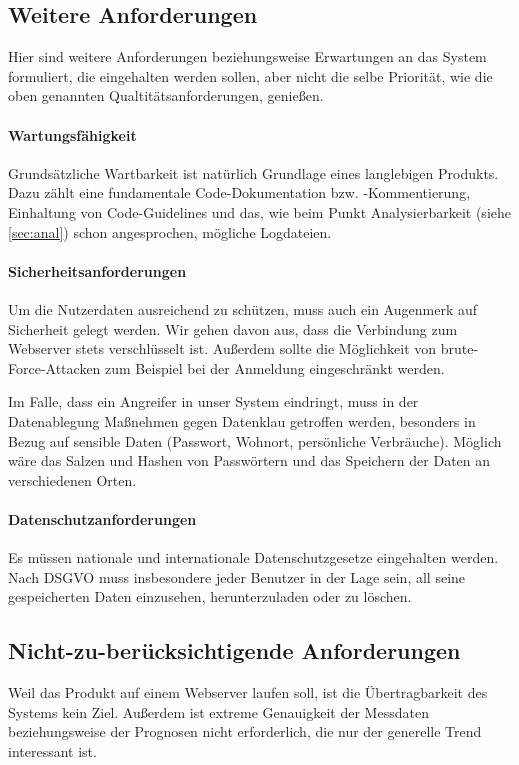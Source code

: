 \subsection{Weitere Anforderungen} \label{sec:other}
Hier sind weitere Anforderungen beziehungsweise Erwartungen an das System formuliert, die eingehalten werden sollen, aber nicht die selbe Priorität, wie die oben genannten Qualtitätsanforderungen, genießen.
\paragraph{Wartungsfähigkeit}

Grundsätzliche Wartbarkeit ist natürlich Grundlage eines langlebigen Produkts. Dazu zählt eine fundamentale Code-Dokumentation bzw. -Kommentierung, Einhaltung von Code-Guidelines und das, wie beim Punkt Analysierbarkeit (siehe \ref{sec:anal}) schon angesprochen, mögliche Logdateien.


\paragraph{Sicherheitsanforderungen}
Um die Nutzerdaten ausreichend zu schützen, muss auch ein Augenmerk auf Sicherheit gelegt werden. Wir gehen davon aus, dass die Verbindung zum Webserver stets verschlüsselt ist. Außerdem sollte die Möglichkeit von brute-Force-Attacken zum Beispiel bei der Anmeldung eingeschränkt werden.

Im Falle, dass ein Angreifer in unser System eindringt, muss in der Datenablegung Maßnehmen gegen Datenklau getroffen werden, besonders in Bezug auf sensible Daten (Passwort, Wohnort, persönliche Verbräuche). Möglich wäre das Salzen und Hashen von Passwörtern und das Speichern der Daten an verschiedenen Orten.

\paragraph{Datenschutzanforderungen}
Es müssen nationale und internationale Datenschutzgesetze eingehalten werden. Nach DSGVO muss insbesondere jeder Benutzer in der Lage sein, all seine gespeicherten Daten einzusehen, herunterzuladen oder zu löschen.

\subsection{Nicht-zu-berücksichtigende Anforderungen}
Weil das Produkt auf einem Webserver laufen soll, ist die Übertragbarkeit des Systems kein Ziel. Außerdem ist extreme Genauigkeit der Messdaten beziehungsweise der Prognosen nicht erforderlich, die nur der generelle Trend interessant ist.